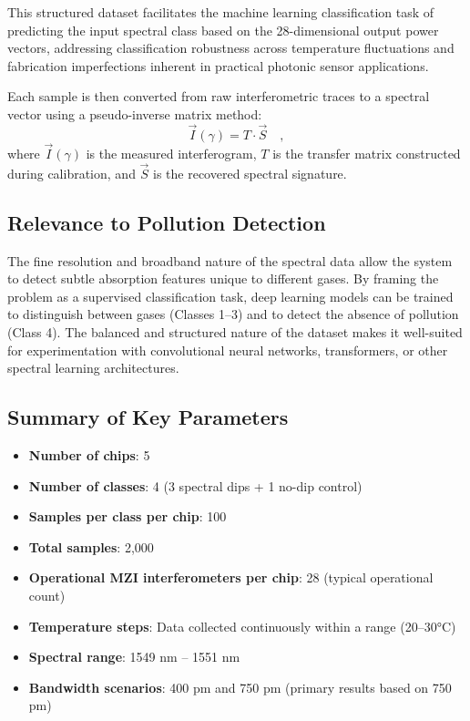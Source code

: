 This structured dataset facilitates the machine learning classification task of predicting the input spectral class based on the 28-dimensional output power vectors, addressing classification robustness across temperature fluctuations and fabrication imperfections inherent in practical photonic sensor applications.

Each sample is then converted from raw interferometric traces to a spectral vector using a pseudo-inverse matrix method:
\begin{equation} 
\vec{I}(\gamma) = T \cdot \vec{S} \quad,    
\end{equation}
where $\vec{I}(\gamma)$ is the  measured interferogram, $T$ is the transfer matrix constructed during calibration, and $\vec{S}$ is the recovered spectral signature.

\subsection{Relevance to Pollution Detection}

The fine resolution and broadband nature of the spectral data allow the system to detect subtle absorption features unique to different gases. By framing the problem as a supervised classification task, deep learning models can be trained to distinguish between gases (Classes 1--3) and to detect the absence of pollution (Class 4). The balanced and structured nature of the dataset makes it well-suited for experimentation with convolutional neural networks, transformers, or other spectral learning architectures.

\subsection{Summary of Key Parameters}

\begin{itemize}
    \item \textbf{Number of chips}: 5
    \item \textbf{Number of classes}: 4 (3 spectral dips + 1 no-dip control)
    \item \textbf{Samples per class per chip}: 100
    \item \textbf{Total samples}: 2,000
    \item \textbf{Operational MZI interferometers per chip}: 28 (typical operational count)
    \item \textbf{Temperature steps}: Data collected continuously within a range (20–30°C)
    \item \textbf{Spectral range}: 1549 nm – 1551 nm
    \item \textbf{Bandwidth scenarios}: 400 pm and 750 pm (primary results based on 750 pm)
\end{itemize}

